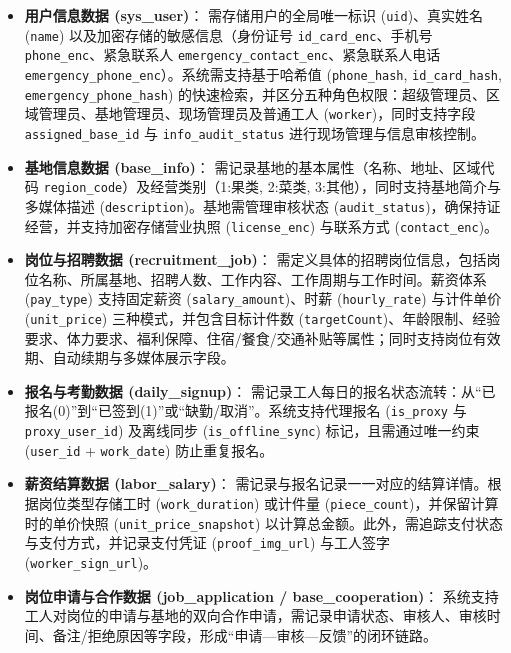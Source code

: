 \documentclass[UTF8,a4paper,12pt]{article}
\begin{document}
\begin{itemize}
    \item \textbf{用户信息数据 (sys\_user)}：
    需存储用户的全局唯一标识 (\texttt{uid})、真实姓名 (\texttt{name}) 以及加密存储的敏感信息（身份证号 \texttt{id\_card\_enc}、手机号 \texttt{phone\_enc}、紧急联系人 \texttt{emergency\_contact\_enc}、紧急联系人电话 \texttt{emergency\_phone\_enc}）。系统需支持基于哈希值 (\texttt{phone\_hash}, \texttt{id\_card\_hash}, \texttt{emergency\_phone\_hash}) 的快速检索，并区分五种角色权限：超级管理员、区域管理员、基地管理员、现场管理员及普通工人 (\texttt{worker})，同时支持字段 \texttt{assigned\_base\_id} 与 \texttt{info\_audit\_status} 进行现场管理与信息审核控制。

    \item \textbf{基地信息数据 (base\_info)}：
    需记录基地的基本属性（名称、地址、区域代码 \texttt{region\_code}）及经营类别（1:果类, 2:菜类, 3:其他），同时支持基地简介与多媒体描述 (\texttt{description})。基地需管理审核状态 (\texttt{audit\_status})，确保持证经营，并支持加密存储营业执照 (\texttt{license\_enc}) 与联系方式 (\texttt{contact\_enc})。

    \item \textbf{岗位与招聘数据 (recruitment\_job)}：
    需定义具体的招聘岗位信息，包括岗位名称、所属基地、招聘人数、工作内容、工作周期与工作时间。薪资体系 (\texttt{pay\_type}) 支持固定薪资 (\texttt{salary\_amount})、时薪 (\texttt{hourly\_rate}) 与计件单价 (\texttt{unit\_price}) 三种模式，并包含目标计件数 (\texttt{targetCount})、年龄限制、经验要求、体力要求、福利保障、住宿/餐食/交通补贴等属性；同时支持岗位有效期、自动续期与多媒体展示字段。

    \item \textbf{报名与考勤数据 (daily\_signup)}：
    需记录工人每日的报名状态流转：从“已报名(0)”到“已签到(1)”或“缺勤/取消”。系统支持代理报名 (\texttt{is\_proxy} 与 \texttt{proxy\_user\_id}) 及离线同步 (\texttt{is\_offline\_sync}) 标记，且需通过唯一约束 (\texttt{user\_id} + \texttt{work\_date}) 防止重复报名。

    \item \textbf{薪资结算数据 (labor\_salary)}：
    需记录与报名记录一一对应的结算详情。根据岗位类型存储工时 (\texttt{work\_duration}) 或计件量 (\texttt{piece\_count})，并保留计算时的单价快照 (\texttt{unit\_price\_snapshot}) 以计算总金额。此外，需追踪支付状态与支付方式，并记录支付凭证 (\texttt{proof\_img\_url}) 与工人签字 (\texttt{worker\_sign\_url})。
    
    \item \textbf{岗位申请与合作数据 (job\_application / base\_cooperation)}：
    系统支持工人对岗位的申请与基地的双向合作申请，需记录申请状态、审核人、审核时间、备注/拒绝原因等字段，形成“申请—审核—反馈”的闭环链路。
    

\end{itemize}
\end{document}
